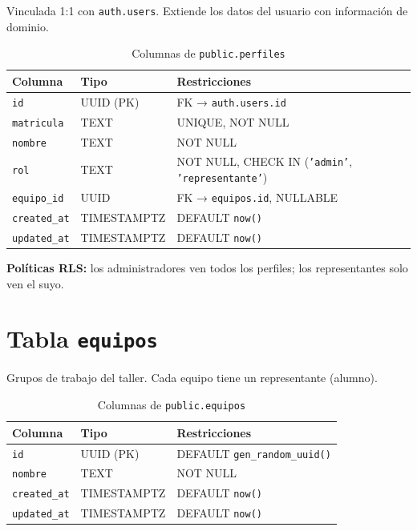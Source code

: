\documentclass[12pt,a4paper,oneside]{report}
\newcommand{\file}[1]{\texttt{\color{cecyteDark}#1}}
\begin{document}
Vinculada 1:1 con \file{auth.users}. Extiende los datos del usuario con información de dominio.

\begin{table}[H]
\centering
\caption{Columnas de \file{public.perfiles}}
\begin{tabular}{@{}L{3.5cm}L{4cm}L{8cm}@{}}
\toprule
{}
\textbf{Columna} & \textbf{Tipo} & \textbf{Restricciones} \\
\midrule
\file{id}        & UUID (PK) & FK → \file{auth.users.id} \\
\file{matricula} & TEXT      & UNIQUE, NOT NULL \\
\file{nombre}    & TEXT      & NOT NULL \\
\file{rol}       & TEXT      & NOT NULL, CHECK IN (\file{'admin'}, \file{'representante'}) \\
\file{equipo\_id}& UUID      & FK → \file{equipos.id}, NULLABLE \\
\file{created\_at}&TIMESTAMPTZ& DEFAULT \file{now()} \\
\file{updated\_at}&TIMESTAMPTZ& DEFAULT \file{now()} \\
\bottomrule
\end{tabular}
\end{table}

\textbf{Políticas RLS:} los administradores ven todos los perfiles; los representantes solo ven el suyo.

\section{Tabla \texttt{equipos}}

Grupos de trabajo del taller. Cada equipo tiene un representante (alumno).

\begin{table}[H]
\centering
\caption{Columnas de \file{public.equipos}}
\begin{tabular}{@{}L{3.5cm}L{4cm}L{8cm}@{}}
\toprule
{}
\textbf{Columna} & \textbf{Tipo} & \textbf{Restricciones} \\
\midrule
\file{id}        & UUID (PK) & DEFAULT \file{gen\_random\_uuid()} \\
\file{nombre}    & TEXT      & NOT NULL \\
\file{created\_at}&TIMESTAMPTZ& DEFAULT \file{now()} \\
\file{updated\_at}&TIMESTAMPTZ& DEFAULT \file{now()} \\
\bottomrule
\end{tabular}
\end{table}
\end{document}
